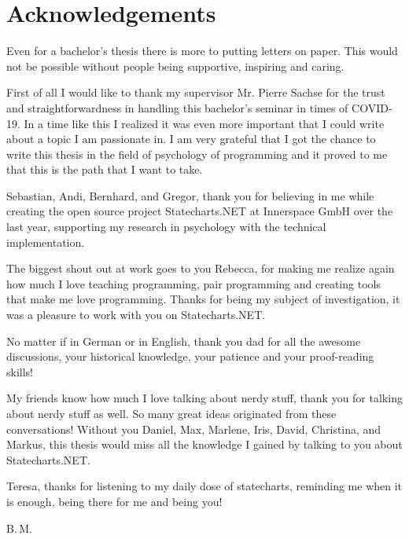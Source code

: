 \chapter{Acknowledgements}
Even for a bachelor's thesis there is more to putting letters on paper.
This would not be possible without people being supportive, inspiring and caring.

First of all I would like to thank my supervisor Mr. Pierre Sachse for the trust and straightforwardness in handling this bachelor's seminar in times of COVID-19.
In a time like this I realized it was even more important that I could write about a topic I am passionate in.
I am very grateful that I got the chance to write this thesis in the field of psychology of programming and it proved to me that this is the path that I want to take.

Sebastian, Andi, Bernhard, and Gregor, thank you for believing in me while creating the open source project Statecharts.NET at Innerspace GmbH over the last year, supporting my research in psychology with the technical implementation.

The biggest shout out at work goes to you Rebecca, for making me realize again how much I love teaching programming, pair programming and creating tools that make me love programming. Thanks for being my subject of investigation, it was a pleasure to work with you on Statecharts.NET.

No matter if in German or in English, thank you dad for all the awesome discussions, your historical knowledge, your patience and your proof-reading skills!

My friends know how much I love talking about nerdy stuff, thank you for talking about nerdy stuff as well. So many great ideas originated from these conversations! Without you Daniel, Max, Marlene, Iris, David, Christina, and Markus, this thesis would miss all the knowledge I gained by talking to you about Statecharts.NET.

Teresa, thanks for listening to my daily dose of statecharts, reminding me when it is enough, being there for me and being you!

\vspace{0.5cm}
\noindent
B.\,M.